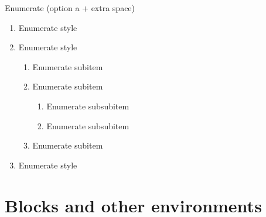 \documentclass[11pt,t,aspectratio=1610,nonav]{beamer}
\begin{document}
\begin{frame}{Enumerate}
(option a + extra space)
\begin{enumerate}[a\enspace]
	\item Enumerate style
	\item Enumerate style
	\begin{enumerate}[a\enspace]
		\item Enumerate subitem
		\item Enumerate subitem
		\begin{enumerate}[a\enspace]
			\item Enumerate subsubitem
			\item Enumerate subsubitem
		\end{enumerate}
		\item Enumerate subitem
	\end{enumerate}
	\item Enumerate style
\end{enumerate}
\end{frame}







\section{Blocks and other environments}	\label{sec:blocks}
\end{document}
